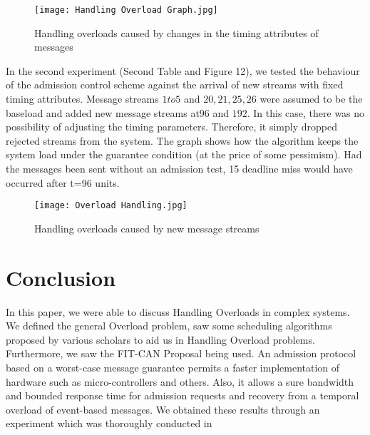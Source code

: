 \documentclass[conference]{IEEEtran}
\begin{document}
\begin{figure}[htp]
    \centering
    \texttt{[image: Handling Overload Graph.jpg]}
    \caption{Handling overloads caused by changes in the timing attributes of messages{ \cite{1377703}}}
    \label{fig:reg-gen}
\end{figure}

In the second experiment (Second Table  and Figure 12), we tested the behaviour of the admission control scheme against the arrival of new streams with fixed timing attributes. Message streams $1 to 5$ and $20, 21, 25, 26$ were assumed to be the baseload and added new message streams at$96$ and $192$. In this case, there was no possibility of adjusting the timing parameters. Therefore, it simply dropped rejected streams from the system. The graph shows how the algorithm keeps the system load under the guarantee condition (at the price of some pessimism). Had the messages been sent without an admission test, 15 deadline miss would have occurred after t=96 units.
\begin{figure}[htp]
    \centering
    \texttt{[image: Overload Handling.jpg]}
    \caption{Handling overloads caused by new message streams{ \cite{1377703}}}
    \label{fig:reg-gen}
\end{figure}



\section{Conclusion}
In this paper, we were able to discuss Handling Overloads in complex systems. We defined the general Overload problem, saw some scheduling algorithms proposed by various scholars to aid us in Handling Overload problems. Furthermore, we saw the FIT-CAN Proposal being used. An admission protocol based on a worst-case message guarantee permits a faster implementation of hardware such as micro-controllers and others. Also, it allows a sure bandwidth and bounded response time for admission requests and recovery from a temporal overload of event-based messages. We obtained these results through an experiment which was thoroughly conducted in \cite{1377703}





\end{document}
